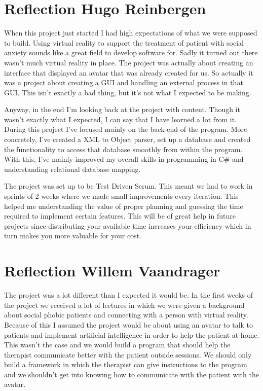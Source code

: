 \section{Reflection Hugo Reinbergen}
When this project just started I had high expectations of what we were supposed to build. Using virtual reality to support the treatment of patient with social anxiety sounds like a great field to develop software for. Sadly it turned out there wasn't much virtual reality in place. The project was actually about creating an interface that displayed an avatar that was already created for us. So actually it was a project about creating a GUI and handling an external process in that GUI. This isn't exactly a bad thing, but it's not what I expected to be making.

Anyway, in the end I'm looking back at the project with content. Though it wasn't exactly what I expected, I can say that I have learned a lot from it. During this project I've focused mainly on the back-end of the program. More concretely, I've created a XML to Object parser, set up a database and created the functionality to access that database smoothly from within the program. With this, I've mainly improved my overall skills in programming in C\# and understanding relational database mapping. 

The project was set up to be Test Driven Scrum. This meant we had to work in sprints of 2 weeks where we made small improvements every iteration. This helped me understanding the value of proper planning and guessing the time required to implement certain features. This will be of great help in future projects since distributing your available time increases your efficiency which in turn makes you more valuable for your cost.

\section{Reflection Willem Vaandrager}
The project was a lot different than I expected it would be. In the first weeks of the project we received a lot of lectures in which we were given a background about social phobic patients and connecting with a person with virtual reality. Because of this I assumed the project would be about using an avatar to talk to patients and implement artificial intelligence in order to help the patient at home. This wasn't the case and we would build a program that should help the therapist communicate better with the patient outside sessions. We should only build a framework in which the therapist can give instructions to the program and we shouldn't get into knowing how to communicate with the patient with the avatar.

